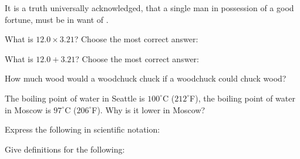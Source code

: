 \documentclass[11pt,addpoints]{exam}   	%
\begin{document}
\begin{questions}
\vspace{.2in}


\question[1]
It is a truth universally acknowledged, that a single man in possession of a good fortune, must be in want of \fillin[a wife].
\vspace{.2in}

\pagebreak

\question[2] What is $ 12.0 \times 3.21 $? Choose the most correct answer:
\begin{choices}
\end{choices}
\vspace{.2in}

\question[2] What is $ 12.0 + 3.21 $? Choose the most correct answer:
\begin{choices}
\end{choices}
\vspace{.2in}

\question[1] How much wood would a woodchuck chuck if a woodchuck could chuck wood?
\vspace{.2in}

\question[1] The boiling point of water in Seattle is $100^{\circ}$C ($212^{\circ}$F), the boiling point of water in Moscow is $97^{\circ}$C ($206^{\circ}$F). Why is it lower in Moscow?
\vspace{.2in}

\question Express the following in scientific notation:
\vspace{.2in}

\question Give definitions for the following:
\end{questions}
\end{document}
